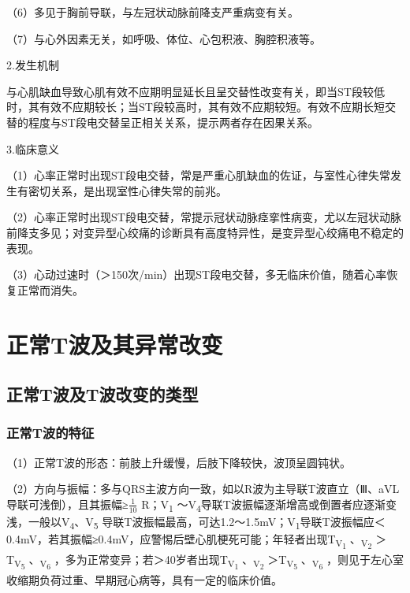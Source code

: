 （6）多见于胸前导联，与左冠状动脉前降支严重病变有关。

（7）与心外因素无关，如呼吸、体位、心包积液、胸腔积液等。

2.发生机制

与心肌缺血导致心肌有效不应期明显延长且呈交替性改变有关，即当ST段较低时，其有效不应期较长；当ST段较高时，其有效不应期较短。有效不应期长短交替的程度与ST段电交替呈正相关关系，提示两者存在因果关系。

3.临床意义

（1）心率正常时出现ST段电交替，常是严重心肌缺血的佐证，与室性心律失常发生有密切关系，是出现室性心律失常的前兆。

（2）心率正常时出现ST段电交替，常提示冠状动脉痉挛性病变，尤以左冠状动脉前降支多见；对变异型心绞痛的诊断具有高度特异性，是变异型心绞痛电不稳定的表现。

（3）心动过速时（＞150次/min）出现ST段电交替，多无临床价值，随着心率恢复正常而消失。

\protect\hypertarget{text00012.html}{}{}

\protect\hypertarget{text00012.htmlux5cux23chapter12}{}{}

\chapter{正常T波及其异常改变}

\protect\hypertarget{text00012.htmlux5cux23subid84}{}{}

\section{正常T波及T波改变的类型}

\protect\hypertarget{text00012.htmlux5cux23subid85}{}{}

\subsection{正常T波的特征}

（1）正常T波的形态：前肢上升缓慢，后肢下降较快，波顶呈圆钝状。

（2）方向与振幅：多与QRS主波方向一致，如以R波为主导联T波直立（Ⅲ、aVL导联可浅倒），且其振幅≥$\frac{1}{10}$
R；V\textsubscript{1} ～V\textsubscript{4}导联T波振幅逐渐增高或倒置者应逐渐变浅，一般以V\textsubscript{4}、V\textsubscript{5} 导联T波振幅最高，可达1.2～1.5mV；V\textsubscript{1}导联T波振幅应＜0.4mV，若其振幅≥0.4mV，应警惕后壁心肌梗死可能；年轻者出现T\textsubscript{V\textsubscript{1}}
、\textsubscript{V\textsubscript{2}}
＞T\textsubscript{V\textsubscript{5}}
、\textsubscript{V\textsubscript{6}}
，多为正常变异；若＞40岁者出现T\textsubscript{V\textsubscript{1}}
、\textsubscript{V\textsubscript{2}}
＞T\textsubscript{V\textsubscript{5}}
、\textsubscript{V\textsubscript{6}}
，则见于左心室收缩期负荷过重、早期冠心病等，具有一定的临床价值。

